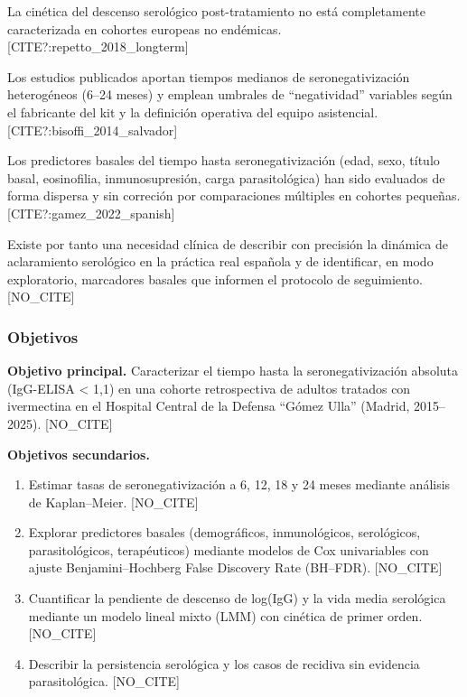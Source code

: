\documentclass[
  spanish,
  12pt,
  a4paper,
]{article}
\providecommand{\tightlist}{%
  \setlength{\itemsep}{0pt}\setlength{\parskip}{0pt}}
\begin{document}
La cinética del descenso serológico post-tratamiento no está
completamente caracterizada en cohortes europeas no endémicas.
{[}CITE?:repetto\_2018\_longterm{]}

Los estudios publicados aportan tiempos medianos de seronegativización
heterogéneos (6--24 meses) y emplean umbrales de ``negatividad''
variables según el fabricante del kit y la definición operativa del
equipo asistencial. {[}CITE?:bisoffi\_2014\_salvador{]}

Los predictores basales del tiempo hasta seronegativización (edad, sexo,
título basal, eosinofilia, inmunosupresión, carga parasitológica) han
sido evaluados de forma dispersa y sin correción por comparaciones
múltiples en cohortes pequeñas. {[}CITE?:gamez\_2022\_spanish{]}

Existe por tanto una necesidad clínica de describir con precisión la
dinámica de aclaramiento serológico en la práctica real española y de
identificar, en modo exploratorio, marcadores basales que informen el
protocolo de seguimiento. {[}NO\_CITE{]}

\subsubsection{Objetivos}\label{objetivos}

\textbf{Objetivo principal.} Caracterizar el tiempo hasta la
seronegativización absoluta (IgG-ELISA \textless{} 1,1) en una cohorte
retrospectiva de adultos tratados con ivermectina en el Hospital Central
de la Defensa ``Gómez Ulla'' (Madrid, 2015--2025). {[}NO\_CITE{]}

\textbf{Objetivos secundarios.}

\begin{enumerate}
\def\labelenumi{\arabic{enumi}.}
\tightlist
\item
  Estimar tasas de seronegativización a 6, 12, 18 y 24 meses mediante
  análisis de Kaplan--Meier. {[}NO\_CITE{]}
\item
  Explorar predictores basales (demográficos, inmunológicos,
  serológicos, parasitológicos, terapéuticos) mediante modelos de Cox
  univariables con ajuste Benjamini--Hochberg False Discovery Rate
  (BH--FDR). {[}NO\_CITE{]}
\item
  Cuantificar la pendiente de descenso de log(IgG) y la vida media
  serológica mediante un modelo lineal mixto (LMM) con cinética de
  primer orden. {[}NO\_CITE{]}
\item
  Describir la persistencia serológica y los casos de recidiva sin
  evidencia parasitológica. {[}NO\_CITE{]}
\end{enumerate}
\end{document}
